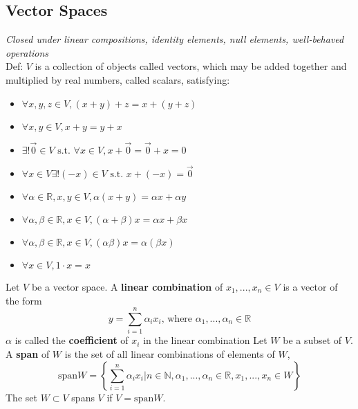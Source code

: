 \documentclass{article}
\newcommand{\N}{\mathbb{N}}
\newcommand{\R}{\mathbb{R}}
\begin{document}
\subsection{Vector Spaces}
\textit{Closed under linear compositions, identity elements, null elements, well-behaved operations}
\medskip \\
Def: $V$ is a collection of objects called vectors, which may be added together and multiplied by real numbers, called scalars, satisfying:
\begin{itemize}
	\item $\forall x,y,z\in V, (x+y)+z=x+(y+z)$
	\item $\forall x,y\in V, x+y=y+x$
	\item $\exists!\vec{0}\in V\text{ s.t. }\forall x\in V, x+ \vec{0}=\vec{0} + x=0$
	\item $\forall x\in V \exists!(-x)\in V\text{ s.t. } x+(-x)=\vec{0}$
	\item $\forall\alpha\in\R,x,y\in V, \alpha(x+y)=\alpha x + \alpha y$
	\item $\forall\alpha,\beta\in\R,x\in V, (\alpha+\beta)x=\alpha x + \beta x$
	\item $\forall\alpha,\beta\in\R,x\in V, (\alpha\beta)x=\alpha(\beta x)$
	\item $\forall x\in V, 1\cdot x=x$
\end{itemize}
\medskip 
Let $V$ be a vector space. A \textbf{linear combination} of $x_1,...,x_n\in V$ is a vector of the form
\[
	y=\sum_{i=1}^n \alpha_i x_i\text{, where }\alpha_1,...,\alpha_n \in \R 
\]
$\alpha$ is called the \textbf{coefficient} of $x_i$ in the linear combination
\medskip 
Let $W$ be a subset of $V$. A \textbf{span} of $W$ is the set of all linear combinations of elements of $W$,
\[
	\text{span}W=\left\{ \sum_{i=1}^n \alpha_i x_i | n\in\N,\alpha_1,...,\alpha_n\in\R,x_1,...,x_n\in W\right\}
\]
The set $W\subset V$ spans $V$ if $V=\text{span}W$.
\end{document}
